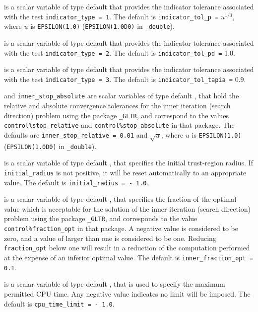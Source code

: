 \begin{description}
is a scalar variable of type default \realdp that
provides the indicator tolerance associated with the test
{\tt indicator\_type = 1}.
The default is {\tt indicator\-\_tol\_p =} $u^{1/3}$,
where $u$ is {\tt EPSILON(1.0)} ({\tt EPSILON(1.0D0)} in 
{\tt \fullpackagename\_double}).

is a scalar variable of type default \realdp that
provides the indicator tolerance associated with the test
{\tt indicator\_type = 2}.
The default is {\tt indicator\-\_tol\_pd =} 1.0.

is a scalar variable of type default \realdp that
provides the indicator tolerance associated with the test
{\tt indicator\_type = 3}.
The default is {\tt indicator\-\_tol\_tapia =} 0.9.

 and {\tt inner\_stop\_absolute} 
are scalar variables of type default \realdp, 
that hold the relative and absolute convergence tolerances for the
inner iteration (search direction) problem using the package 
{\tt \libraryname\_GLTR},
and correspond to the values {\tt control\%stop\_relative} and
{\tt control\%stop\_absolute} in that package.
The defaults are 
{\tt inner\_stop\_relative = 0.01}
and  $\sqrt{u}$,
where $u$ is {\tt EPSILON(1.0)} ({\tt EPSILON(1.0D0)} in 
{\tt \fullpackagename\_double}).

 is a scalar variable of type default 
\realdp, that specifies the initial trust-region radius. 
If {\tt initial\_radius} is
not positive, it will be reset automatically to an appropriate value.
The default is {\tt initial\_radius = - 1.0}.

 is a scalar variable of type default 
\realdp, that specifies the
fraction of the optimal value which is acceptable for the solution of the
inner iteration (search direction) problem using the package 
{\tt \libraryname\_GLTR}, 
and corresponds to the value {\tt control\%fraction\_opt} in that package.
A negative value is considered to be zero, and a value of larger than one
is considered to be one. Reducing {\tt fraction\_opt} below one will result
in a reduction of the computation performed at the expense of an inferior
optimal value.
The default is {\tt inner\_fraction\_opt = 0.1}.

 is a scalar variable of type default \realdp, 
that is used to specify the maximum permitted CPU time. Any negative
value indicates no limit will be imposed. The default is 
{\tt cpu\_time\_limit = - 1.0}.


\end{description}
